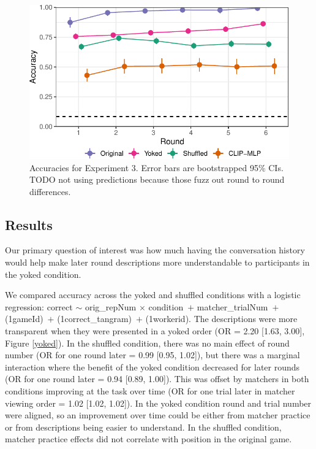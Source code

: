 \documentclass[10pt, letterpaper]{article}
\begin{document}
\begin{CodeChunk}
\begin{figure}[t]

{\centering \includegraphics[width=0.9\linewidth]{figs/fig-yoked-1} 

}

\caption[Accuracies for Experiment 3]{Accuracies for Experiment 3. Error bars are bootstrapped 95\% CIs. TODO not using predictions because those fuzz out round to round differences. \label{yoked}}\label{fig:fig-yoked}
\end{figure}
\end{CodeChunk}

\subsection{Results}\label{results-2}

Our primary question of interest was how much having the conversation
history would help make later round descriptions more understandable to
participants in the yoked condition.

We compared accuracy across the yoked and shuffled conditions with a
logistic regression: correct \({\sim}\) orig\_repNum \({\times}\)
condition~\({+}\) matcher\_trialNum~\({+}\) (1\textbar gameId)~\({+}\)
(1\textbar correct\_tangram)~\({+}\) (1\textbar workerid). The
descriptions were more transparent when they were presented in a yoked
order (OR = 2.20 {[}1.63, 3.00{]}, Figure \ref{yoked}). In the shuffled
condition, there was no main effect of round number (OR for one round
later = 0.99 {[}0.95, 1.02{]}), but there was a marginal interaction
where the benefit of the yoked condition decreased for later rounds (OR
for one round later = 0.94 {[}0.89, 1.00{]}). This was offset by
matchers in both conditions improving at the task over time (OR for one
trial later in matcher viewing order = 1.02 {[}1.02, 1.02{]}). In the
yoked condition round and trial number were aligned, so an improvement
over time could be either from matcher practice or from descriptions
being easier to understand. In the shuffled condition, matcher practice
effects did not correlate with position in the original game.
\end{document}
